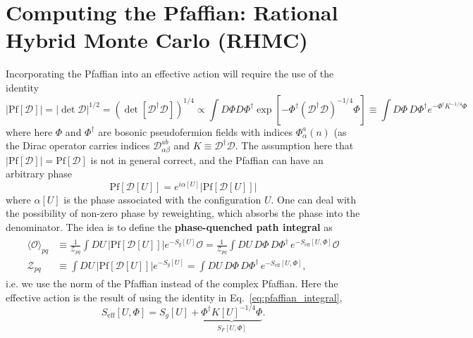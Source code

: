 
\section{Computing the Pfaffian: Rational Hybrid Monte Carlo (RHMC)}

Incorporating the Pfaffian into an effective action will require the use of the identity
\begin{equation}
    |\mathrm{Pf}[\mathcal D]| = |\det\mathcal D|^{1/2} = (\det [\mathcal D^\dagger \mathcal D])^{1/4} \propto \int D\Phi D\Phi^\dagger \exp \left[ -\Phi^\dagger (\mathcal D^\dagger \mathcal D)^{-1/4} \Phi \right] \equiv \int D\Phi\, D\Phi^\dagger e^{-\Phi^\dagger K^{-1/4} \Phi}
    \label{eq:pfaffian_integral}
\end{equation}
where here $\Phi$ and $\Phi^\dagger$ are bosonic pseudofermion fields with indices $\Phi_\alpha^a(n)$ (as the Dirac operator carries indices $\mathcal D_{\alpha\beta}^{ab}$ and $K\equiv \mathcal D^\dagger\mathcal D$. The assumption here that $|\mathrm{Pf}[\mathcal D]| = \mathrm{Pf}[\mathcal D]$ is not in general correct, and the Pfaffian can have an arbitrary phase 
\begin{equation}
    \mathrm{Pf}[\mathcal D[U]] = e^{i\alpha[U]} |\mathrm{Pf}[\mathcal D[U]]|
\end{equation}
where $\alpha[U]$ is the phase associated with the configuration $U$. One can deal with the possibility of non-zero phase by reweighting, which absorbs the phase into the denominator. The idea is to define the \textbf{phase-quenched path integral} as
\begin{align}\begin{split}
    \langle \mathcal O \rangle_{pq} &\equiv \frac{1}{\mathcal Z_{pq}}\int DU\, |\mathrm{Pf}[\mathcal D[U]]| e^{-S_g[U]} \mathcal O = \frac{1}{\mathcal Z_{pq}} \int DU\, D\Phi\,D\Phi^\dagger\, e^{-S_\mathrm{eff}[U, \Phi]} \mathcal O \\ 
    \mathcal Z_{pq} &\equiv \int DU\, |\mathrm{Pf}[\mathcal D[U]]| e^{-S_g[U]} = \int DU\, D\Phi\,D\Phi^\dagger\, e^{-S_\mathrm{eff}[U, \Phi]},
\end{split}\end{align}
i.e. we use the norm of the Pfaffian instead of the complex Pfaffian. Here the effective action is the result of using the identity in Eq.~\eqref{eq:pfaffian_integral},
\begin{equation}
	S_{\mathrm{eff}}[U, \Phi] = S_g[U] + \underbrace{\Phi^\dagger K[U]^{-1/4} \Phi}_{S_F[U, \Phi]}.
\end{equation}
